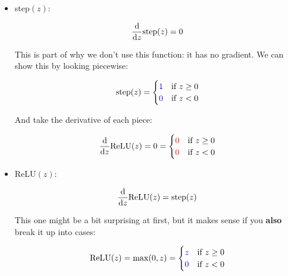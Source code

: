         \begin{itemize}
            \item {} step$(z)$:
            
                \begin{equation}
                    \frac{\dd }{\dd z} \text{step}(z) = 0
                \end{equation}
                
                This is part of why we don't use this function: it has no gradient. We can show this by looking piecewise:
                
                \begin{equation}
                    \text{step}(z) 
                    =
                    \begin{cases}
                      \textcolor{blue}{1} & \text{if $z \geq 0$}\\
                      \textcolor{blue}{0} & \text{if $z < 0$}
                    \end{cases}
                \end{equation}
                
                And take the derivative of each piece:
                
                \begin{equation}
                    \frac{\dd }{\dd z} \text{ReLU}(z)
                    =
                    0
                    =
                    \begin{cases}
                      \textcolor{red}{0} & \text{if $z \geq 0$}\\
                      \textcolor{red}{0} & \text{if $z < 0$}
                    \end{cases}
                \end{equation}
        
            \item {} ReLU$(z)$:
            
                \begin{equation}
                    \frac{\dd }{\dd z} \text{ReLU}(z) = \text{step}(z)
                \end{equation}
                
                This one might be a bit surprising at first, but it makes sense if you \textbf{also} break it up into cases:
                
                \begin{equation}
                    \text{ReLU}(z) 
                    =
                    \max(0,z)
                    =
                    \begin{cases}
                      \textcolor{blue}{z} & \text{if $z \geq 0$}\\
                      \textcolor{blue}{0} & \text{if $z < 0$}
                    \end{cases}
                \end{equation}
                

\end{itemize}
